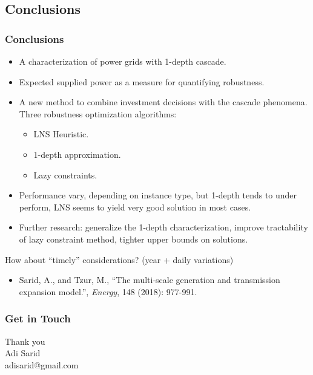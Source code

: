 \documentclass{beamer}
\begin{document}
\subsection{Conclusions}
\begin{frame}
\frametitle{Conclusions}
\begin{itemize}
	\item A characterization of power grids with 1-depth cascade.\pause
	\item Expected supplied power as a measure for quantifying robustness.\pause
	\item A new method to combine investment decisions with the cascade phenomena. Three robustness optimization algorithms:
	\begin{itemize}
		\item LNS Heuristic.
		\item 1-depth approximation.
		\item Lazy constraints.
	\end{itemize}\pause
	\item Performance vary, depending on instance type, but 1-depth tends to under perform, LNS seems to yield very good solution in most cases.\pause
	\item Further research: generalize the 1-depth characterization, improve tractability of lazy constraint method, tighter upper bounds on solutions.\pause
\end{itemize}
How about ``timely'' considerations? (year + daily variations)
\begin{itemize}
	\item Sarid, A., and Tzur, M., ``The multi-scale generation and transmission expansion model.'', \emph{Energy}, 148 (2018): 977-991.
\end{itemize}
\end{frame}

\subsubsection{Get in Touch}
\begin{frame}
\LARGE Thank you\\
\vspace{2.5cm}
\normalsize
Adi Sarid\\
adisarid@gmail.com
\end{frame}
\end{document}
